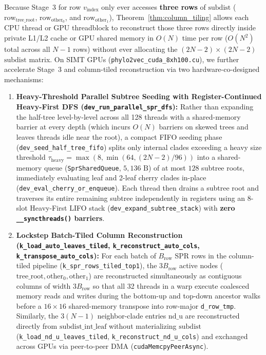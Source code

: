 \documentclass[11pt,a4paper]{article}
\theoremstyle{definition}
\begin{document}
Because Stage~3 for row $v_{\text{index}}$ only ever accesses \textbf{three rows} of $\text{subdist}$ ($\text{row}_{\text{tree\_root}}$, $\text{row}_{\text{other}_0}$, and $\text{row}_{\text{other}_1}$), Theorem~\ref{thm:column_tiling} allows each CPU thread or GPU threadblock to reconstruct those three rows directly inside private L1/L2 cache or GPU shared memory in $O(N)$ time per row ($O(N^2)$ total across all $N-1$ rows) without ever allocating the $(2N-2) \times (2N-2)$ $\text{subdist}$ matrix. On SIMT GPUs (\texttt{phylo2vec\_cuda\_8xh100.cu}), we further accelerate Stage~3 and column-tiled reconstruction via two hardware-co-designed mechanisms:
\begin{enumerate}
    \item \textbf{Heavy-Threshold Parallel Subtree Seeding with Register-Continued Heavy-First DFS (\texttt{dev\_run\_parallel\_spr\_dfs}):} Rather than expanding the half-tree level-by-level across all 128 threads with a shared-memory barrier at every depth (which incurs $O(N)$ barriers on skewed trees and leaves threads idle near the root), a compact FIFO seeding phase (\texttt{dev\_seed\_half\_tree\_fifo}) splits only internal clades exceeding a heavy size threshold $\tau_{\text{heavy}} = \max(8, \min(64, (2N-2)/96))$ into a shared-memory queue (\texttt{SprSharedQueue}, $5{,}136\text{ B}$) of at most $128$ subtree roots, immediately evaluating leaf and 2-leaf cherry clades in-place (\texttt{dev\_eval\_cherry\_or\_enqueue}). Each thread then drains a subtree root and traverses its entire remaining subtree independently in registers using an 8-slot Heavy-First LIFO stack (\texttt{dev\_expand\_subtree\_stack}) with \textbf{zero \texttt{\_\_syncthreads()} barriers}.
    \item \textbf{Lockstep Batch-Tiled Column Reconstruction (\texttt{k\_load\_auto\_leaves\_tiled}, \texttt{k\_reconstruct\_auto\_cols}, \texttt{k\_transpose\_auto\_cols}):} For each batch of $B_{\text{row}}$ SPR rows in the column-tiled pipeline (\texttt{k\_spr\_rows\_tiled\_top1}), the $3 B_{\text{row}}$ active nodes ($\text{tree\_root}, \text{other}_0, \text{other}_1$) are reconstructed simultaneously as contiguous columns of width $3 B_{\text{row}}$ so that all 32 threads in a warp execute coalesced memory reads and writes during the bottom-up and top-down ancestor walks before a $16 \times 16$ shared-memory transpose into row-major \texttt{d\_row\_tmp}. Similarly, the $3(N-1)$ neighbor-clade entries $\text{nd\_u}$ are reconstructed directly from $\text{subdist\_int\_leaf}$ without materializing $\text{subdist}$ (\texttt{k\_load\_nd\_u\_leaves\_tiled}, \texttt{k\_reconstruct\_nd\_u\_cols}) and exchanged across GPUs via peer-to-peer DMA (\texttt{cudaMemcpyPeerAsync}).
\end{enumerate}
\end{document}
